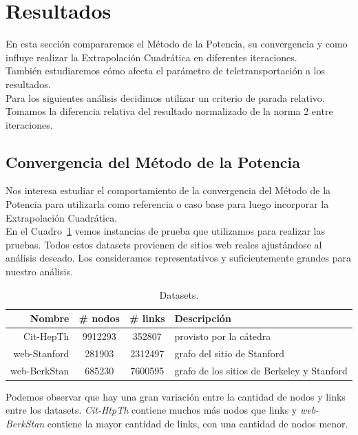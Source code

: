 \section{Resultados}

En esta sección compararemos el Método de la Potencia, su convergencia y como
influye realizar la Extrapolación Cuadrática en diferentes iteraciones.\\

También estudiaremos cómo afecta el parámetro de teletransportación a los
resultados.\\

Para los siguientes análisis decidimos utilizar un criterio de parada relativo.
Tomamos la diferencia relativa del resultado normalizado de la norma 2 entre
iteraciones.

\subsection{Convergencia del Método de la Potencia}\label{sec:convergencia}

Nos interesa estudiar el comportamiento de la convergencia del Método de la
Potencia para utilizarla como referencia o caso base para luego incorporar la
Extrapolación Cuadrática.\\

En el Cuadro~\ref{tab:datasets} vemos instancias de prueba que utilizamos para
realizar las pruebas. Todos estos datasets provienen de sitios web reales
ajustándose al análisis deseado. Los consideramos representativos y
suficientemente grandes para nuestro análisis.

\begin{table}[!htbp]
    \centering
    \begin{tabular}{|r|c|c|l|} \hline
        Nombre & \# nodos & \# links & Descripción \\ \hline
        Cit-HepTh & 9912293 & 352807 & provisto por la cátedra \\ \hline
        web-Stanford & 281903 & 2312497 & grafo del sitio de Stanford \\ \hline
        web-BerkStan & 685230 & 7600595 & grafo de los sitios de Berkeley y Stanford \\ \hline
    \end{tabular}
    \caption{Datasets.}\label{tab:datasets}
\end{table}

Podemos observar que hay una gran variación entre la cantidad de nodos y links
entre los datasets. \emph{Cit-HtpTh} contiene muchos más nodos que links y
\emph{web-BerkStan} contiene la mayor cantidad de links, con una cantidad de
nodos menor.

